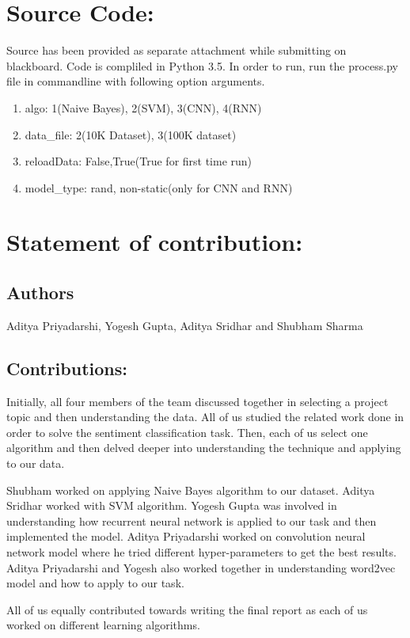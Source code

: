 \documentclass[11pt]{article}
\begin{document}
	\section{Source Code:} Source has been provided as separate attachment while submitting on blackboard. Code is compliled in Python 3.5. In order to run, run the process.py file in commandline with following option arguments.
	\begin{enumerate}
		\item algo: 1(Naive Bayes), 2(SVM), 3(CNN), 4(RNN)
		\item data\_file: 2(10K Dataset), 3(100K dataset)
		\item reloadData: False,True(True for first time run)
		\item model\_type: rand, non-static(only for CNN and RNN)
	\end{enumerate}
	
	\section{Statement of contribution:}
		\subsection{Authors} Aditya Priyadarshi, Yogesh Gupta, Aditya Sridhar  and Shubham Sharma
		
		\subsection{Contributions:}
	 Initially, all four members of the team discussed together in selecting a project topic and then understanding the data. All of us studied the related work done in order to solve the sentiment classification task. Then, each of us select one algorithm and then delved deeper into understanding the technique and applying to our data.
	 
	 Shubham worked on applying Naive Bayes algorithm to our dataset. Aditya Sridhar worked with SVM algorithm. Yogesh Gupta was involved in understanding how recurrent neural network is applied to our task and then implemented the model. Aditya Priyadarshi worked on convolution neural network model where he tried different hyper-parameters to get the best results. Aditya Priyadarshi and Yogesh also worked together in understanding word2vec model and how to apply to our task.
	 
	 All of us equally contributed towards writing the final report as each of us worked on different learning algorithms. 
		
	
	
	
	
	
	
\end{document}
